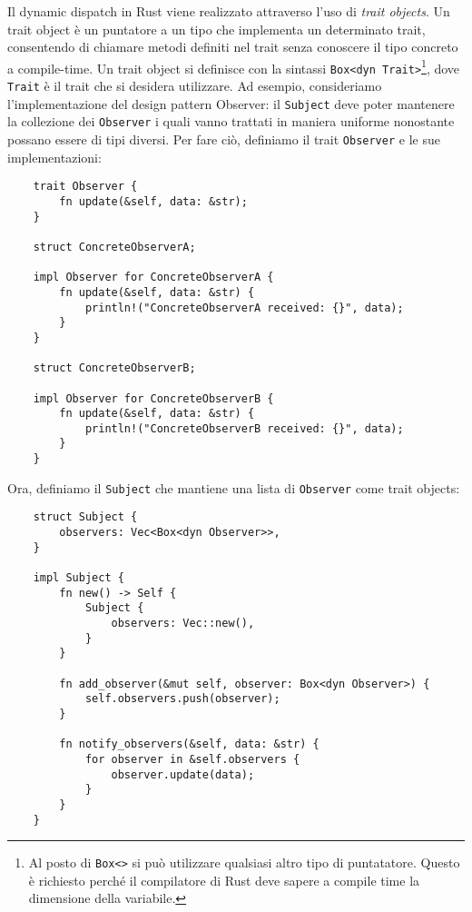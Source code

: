 Il dynamic dispatch in Rust viene realizzato attraverso l'uso di \textit{trait objects}. Un trait object è un puntatore a un tipo che implementa un determinato trait, consentendo di chiamare metodi definiti nel trait senza conoscere il tipo concreto a compile-time. Un trait object si definisce con la sintassi \texttt{Box<dyn Trait>}\footnote{Al posto di \texttt{Box<>} si può utilizzare qualsiasi altro tipo di puntatatore. Questo è richiesto perché il compilatore di Rust deve sapere a compile time la dimensione della variabile.}, dove \texttt{Trait} è il trait che si desidera utilizzare. Ad esempio, consideriamo l'implementazione del design pattern Observer: il \texttt{Subject} deve poter mantenere la collezione dei \texttt{Observer} i quali vanno trattati in maniera uniforme nonostante possano essere di tipi diversi. Per fare ciò, definiamo il trait \texttt{Observer} e le sue implementazioni:
\begin{verbatim}
    trait Observer {
        fn update(&self, data: &str);
    }

    struct ConcreteObserverA;

    impl Observer for ConcreteObserverA {
        fn update(&self, data: &str) {
            println!("ConcreteObserverA received: {}", data);
        }
    }

    struct ConcreteObserverB;

    impl Observer for ConcreteObserverB {
        fn update(&self, data: &str) {
            println!("ConcreteObserverB received: {}", data);
        }
    }
\end{verbatim}
Ora, definiamo il \texttt{Subject} che mantiene una lista di \texttt{Observer} come trait objects:
\begin{verbatim}
    struct Subject {
        observers: Vec<Box<dyn Observer>>,
    }

    impl Subject {
        fn new() -> Self {
            Subject {
                observers: Vec::new(),
            }
        }

        fn add_observer(&mut self, observer: Box<dyn Observer>) {
            self.observers.push(observer);
        }

        fn notify_observers(&self, data: &str) {
            for observer in &self.observers {
                observer.update(data);
            }
        }
    }
\end{verbatim}
